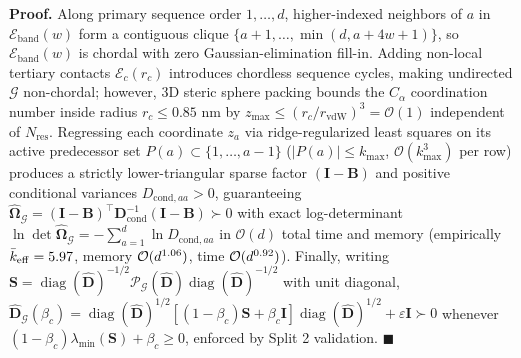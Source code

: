 \documentclass[10pt,letterpaper]{article}
\DeclareMathOperator{\diag}{diag}
\begin{document}
\textbf{Proof.} Along primary sequence order $1,\dots,d$, higher-indexed neighbors of $a$ in $\mathcal{E}_{\mathrm{band}}(w)$ form a contiguous clique $\{a+1,\dots,\min(d,a+4w+1)\}$, so $\mathcal{E}_{\mathrm{band}}(w)$ is chordal with zero Gaussian-elimination fill-in. Adding non-local tertiary contacts $\mathcal{E}_c(r_c)$ introduces chordless sequence cycles, making undirected $\mathcal{G}$ non-chordal; however, 3D steric sphere packing bounds the $C_\alpha$ coordination number inside radius $r_c \le 0.85\text{ nm}$ by $z_{\max} \le (r_c/r_{\mathrm{vdW}})^3 = \mathcal{O}(1)$ independent of $N_{\mathrm{res}}$. Regressing each coordinate $z_a$ via ridge-regularized least squares on its active predecessor set $P(a) \subset \{1,\dots,a-1\}$ ($|P(a)| \le k_{\max}$, $\mathcal{O}(k_{\max}^3)$ per row) produces a strictly lower-triangular sparse factor $(\mathbf{I}-\mathbf{B})$ and positive conditional variances $D_{\mathrm{cond},aa} > 0$, guaranteeing $\hat{\bm{\Omega}}_{\mathcal{G}} = (\mathbf{I}-\mathbf{B})^\top\mathbf{D}_{\mathrm{cond}}^{-1}(\mathbf{I}-\mathbf{B}) \succ 0$ with exact log-determinant $\ln\det\hat{\bm{\Omega}}_{\mathcal{G}} = -\sum_{a=1}^d \ln D_{\mathrm{cond},aa}$ in $\mathcal{O}(d)$ total time and memory (empirically $\bar{k}_{\mathrm{eff}} = 5.97{}$, memory $\mathcal{O}(d^{1.06{}})$, time $\mathcal{O}(d^{0.92{}})$). Finally, writing $\mathbf{S} = \diag(\hat{\mathbf{D}})^{-1/2}\mathcal{P}_{\mathcal{G}}(\hat{\mathbf{D}})\diag(\hat{\mathbf{D}})^{-1/2}$ with unit diagonal, $\hat{\mathbf{D}}_{\mathcal{G}}(\beta_c) = \diag(\hat{\mathbf{D}})^{1/2}[(1-\beta_c)\mathbf{S} + \beta_c\mathbf{I}]\diag(\hat{\mathbf{D}})^{1/2} + \varepsilon\mathbf{I} \succ 0$ whenever $(1-\beta_c)\lambda_{\min}(\mathbf{S}) + \beta_c \ge 0$, enforced by Split 2 validation. $\blacksquare$
\end{document}
